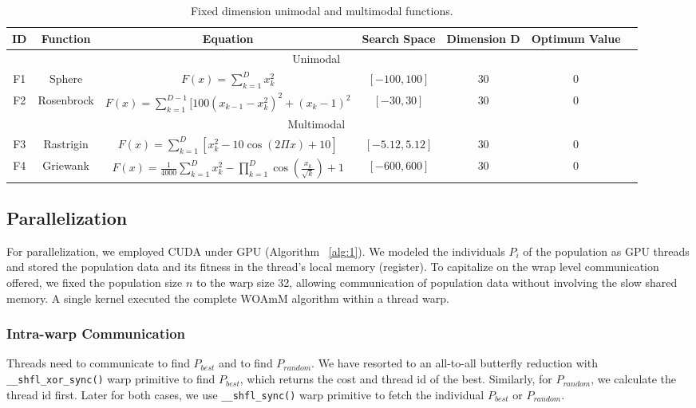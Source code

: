 \documentclass[conference]{IEEEtran}
\begin{document}
    \begin{table}[!t]\renewcommand{\arraystretch}{1}
        \caption{Fixed dimension unimodal and multimodal functions.}
        \label{tbl:func}
        \centering
        \begin{tabular}{|c|c|c|c|c|c|c|}
        \hline\bfseries ID & \bfseries Function & \bfseries Equation & \bfseries Search Space & \bfseries Dimension D & \bfseries Optimum Value\\
        \hline \multicolumn{6}{|c|}{Unimodal} \\
        \hline F1 & Sphere & \(F(x)=\sum_{k=1}^Dx_k^2\) & \([-100,100]\)&30&0\\
        \hline F2 & Rosenbrock & \(F(x)=\sum_{k=1}^{D-1}[100(x_{k-1}-x_k^2)^2+(x_k-1)^2\) & \([-30,30]\)&30&0\\
        \hline \multicolumn{6}{|c|}{Multimodal} \\
        \hline F3 & Rastrigin & \(F(x)=\sum_{k=1}^{D}[x_k^2-10\cos(2\Pi x)+10]\) & \([-5.12,5.12]\)&30&0\\
        \hline F4 & Griewank & \(F(x)=\frac{1}{4000}\sum_{k=1}^{D}x_k^2-\prod_{k=1}^D\cos(\frac{x_k}{\sqrt{k}})+1\) & \([-600,600]\)&30&0\\
        \hline
    \end{tabular}
    \end{table}

\subsection{Parallelization}

For parallelization, we employed CUDA under GPU (Algorithm ~\ref{alg:1}). 
We modeled the individuals $P_i$ of the population as GPU threads and stored the population data and its fitness in the thread’s local memory (register). 
To capitalize on the wrap level communication offered, we fixed the population size $n$ to the warp size 32, allowing communication of population data without involving the slow shared memory. 
A single kernel executed the complete WOAmM algorithm within a thread warp.

\subsubsection{Intra-warp Communication}

Threads need to communicate to find $P_{best}$ and to find $P_{random}$. 
We have resorted to an all-to-all butterfly reduction with \lstinline{__shfl_xor_sync()} warp primitive to find $P_{best}$, which returns the cost and thread id of the best. 
Similarly, for $P_{random}$, we calculate the thread id first. 
Later for both cases, we use \lstinline{__shfl_sync()} warp primitive to fetch the individual $P_{best}$ or $P_{random}$.
\end{document}
